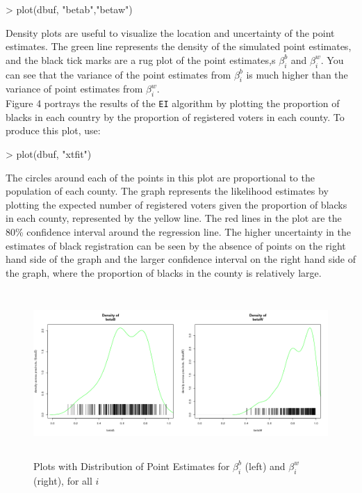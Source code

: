 \documentclass[11pt,oneside,letterpaper,titlepage]{article}
\begin{document}
\begin{Schunk}
\begin{Sinput}
> plot(dbuf, "betab","betaw")
\end{Sinput}
\end{Schunk}

\noindent Density plots are useful to visualize the location and uncertainty of the point estimates.  The green line represents the density of the simulated point estimates, and the black tick marks are a rug plot of the point estimates,s $\beta_i^b$ and $\beta_i^w$.  You can see that the variance of the point estimates from $\beta_i^b$ is much higher than the variance of point estimates from $\beta_i^w$. \\ 
\newline
Figure 4 portrays the results of the \verb#EI# algorithm by plotting the proportion of blacks in each country by the proportion of registered voters in each county.  To produce this plot, use:

\begin{Schunk}
\begin{Sinput}
> plot(dbuf, "xtfit")
\end{Sinput}
\end{Schunk}

\noindent The circles around each of the points in this plot are proportional to the population of each county.  The graph represents the likelihood estimates by plotting the expected number of registered voters given the proportion of blacks in each county, represented by the yellow line. The red lines in the plot are the 80\% confidence interval around the regression line.  The higher uncertainty in the estimates of black registration can be seen by the absence of points on the right hand side of the graph and the larger confidence interval on the right hand side of the graph, where the proportion of blacks in the county is relatively large.  


\begin{figure}[h]
\begin{center}
\includegraphics[width=8.5in, height=2.5in,   viewport=0 0 1400 395,clip]{betas.png} 
\end{center}
\caption{Plots with Distribution of Point Estimates for $\beta_i^b$
  (left) and $\beta_i^w$ (right), for all $i$}
\label{fig:betas}
\end{figure}
\end{document}
